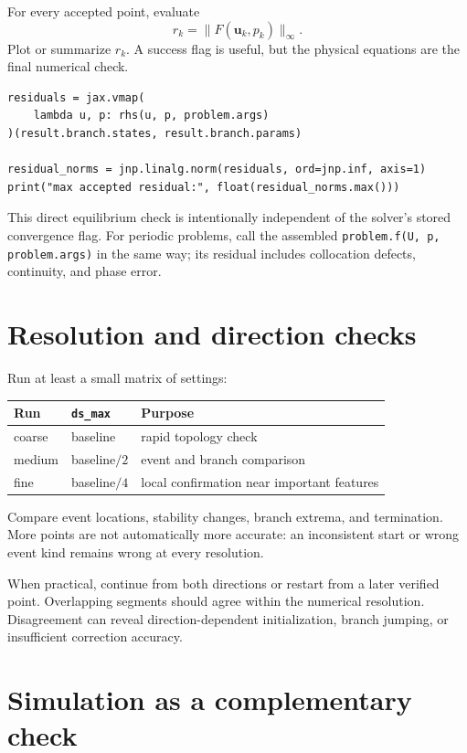 \documentclass[11pt,oneside]{book}
\newcommand{\state}{\bm{u}}
\newcommand{\residual}{F}
\begin{document}
For every accepted point, evaluate
\[
  r_k=\|\residual(\state_k,p_k)\|_\infty.
\]
Plot or summarize $r_k$. A success flag is useful, but the physical equations
are the final numerical check.

\begin{lstlisting}
residuals = jax.vmap(
    lambda u, p: rhs(u, p, problem.args)
)(result.branch.states, result.branch.params)

residual_norms = jnp.linalg.norm(residuals, ord=jnp.inf, axis=1)
print("max accepted residual:", float(residual_norms.max()))
\end{lstlisting}

This direct equilibrium check is intentionally independent of the solver's
stored convergence flag. For periodic problems, call the assembled
\texttt{problem.f(U, p, problem.args)} in the same way; its residual includes
collocation defects, continuity, and phase error.

\section{Resolution and direction checks}

Run at least a small matrix of settings:

\begin{center}
\begin{tabular}{lll}
\toprule
Run & \texttt{ds\_max} & Purpose\\
\midrule
coarse & baseline & rapid topology check\\
medium & baseline$/2$ & event and branch comparison\\
fine & baseline$/4$ & local confirmation near important features\\
\bottomrule
\end{tabular}
\end{center}

Compare event locations, stability changes, branch extrema, and termination.
More points are not automatically more accurate: an inconsistent start or
wrong event kind remains wrong at every resolution.

When practical, continue from both directions or restart from a later verified
point. Overlapping segments should agree within the numerical resolution.
Disagreement can reveal direction-dependent initialization, branch jumping, or
insufficient correction accuracy.

\section{Simulation as a complementary check}
\end{document}
